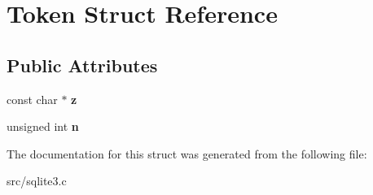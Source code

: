 \hypertarget{struct_token}{\section{Token Struct Reference}
\label{struct_token}
}
\subsection*{Public Attributes}
\begin{DoxyCompactItemize}
\item 
\hypertarget{struct_token_a57b502141e3018e4a02773424acb4ffd}{const char $\ast$ {\bfseries z}}\label{struct_token_a57b502141e3018e4a02773424acb4ffd}

\item 
\hypertarget{struct_token_ad8442439e00ab9713a9b91a53e44c2aa}{unsigned int {\bfseries n}}\label{struct_token_ad8442439e00ab9713a9b91a53e44c2aa}

\end{DoxyCompactItemize}


The documentation for this struct was generated from the following file\-:\begin{DoxyCompactItemize}
\item 
src/sqlite3.\-c\end{DoxyCompactItemize}
